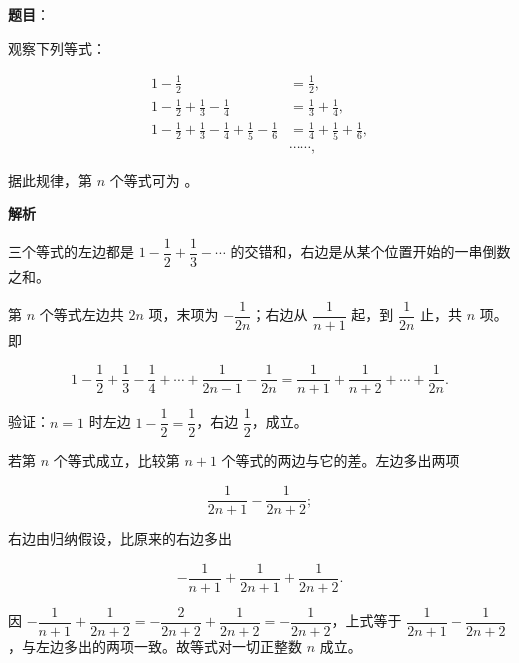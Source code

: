 \begin{answer}

\textbf{题目}：

观察下列等式：

\nopagebreak[4]
\[
\begin{aligned}
1-\frac{1}{2}&=\frac{1}{2},\\
1-\frac{1}{2}+\frac{1}{3}-\frac{1}{4}&=\frac{1}{3}+\frac{1}{4},\\
1-\frac{1}{2}+\frac{1}{3}-\frac{1}{4}+\frac{1}{5}-\frac{1}{6}&=\frac{1}{4}+\frac{1}{5}+\frac{1}{6},\\
&\cdots\cdots,
\end{aligned}
\]

据此规律，第 $n$ 个等式可为 \gkblank{}。

\textbf{解析}

三个等式的左边都是 $1-\dfrac{1}{2}+\dfrac{1}{3}-\cdots$ 的交错和，右边是从某个位置开始的一串倒数之和。

第 $n$ 个等式左边共 $2n$ 项，末项为 $-\dfrac{1}{2n}$；右边从 $\dfrac{1}{n+1}$ 起，到 $\dfrac{1}{2n}$ 止，共 $n$ 项。即

\nopagebreak[4]
\[
1-\frac{1}{2}+\frac{1}{3}-\frac{1}{4}+\cdots+\frac{1}{2n-1}-\frac{1}{2n}=\frac{1}{n+1}+\frac{1}{n+2}+\cdots+\frac{1}{2n}.
\]

验证：$n=1$ 时左边 $1-\dfrac{1}{2}=\dfrac{1}{2}$，右边 $\dfrac{1}{2}$，成立。

若第 $n$ 个等式成立，比较第 $n+1$ 个等式的两边与它的差。左边多出两项

\nopagebreak[4]
\[
\frac{1}{2n+1}-\frac{1}{2n+2};
\]

右边由归纳假设，比原来的右边多出

\nopagebreak[4]
\[
-\frac{1}{n+1}+\frac{1}{2n+1}+\frac{1}{2n+2}.
\]

因 $-\dfrac{1}{n+1}+\dfrac{1}{2n+2}=-\dfrac{2}{2n+2}+\dfrac{1}{2n+2}=-\dfrac{1}{2n+2}$，上式等于 $\dfrac{1}{2n+1}-\dfrac{1}{2n+2}$，与左边多出的两项一致。故等式对一切正整数 $n$ 成立。


\end{answer}

